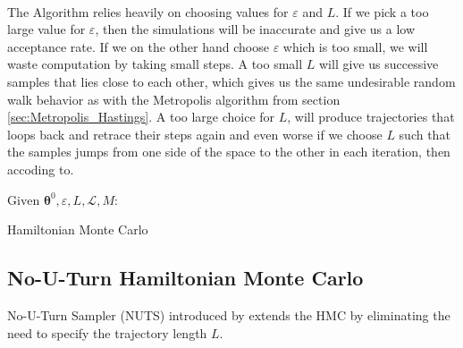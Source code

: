 \\
The Algorithm relies heavily on choosing values for $\varepsilon$ and $L$. If we pick a too large value for $\varepsilon$, then the simulations will be inaccurate and give us a low acceptance rate. If we on the other hand choose $\varepsilon$ which is too small, we will waste computation by taking small steps. A too small $L$ will give us successive samples that lies close to each other, which gives us the same undesirable random walk behavior as with the Metropolis algorithm from section \ref{sec:Metropolis_Hastings}. A too large choice for $L$, will produce trajectories that loops back and retrace their steps again and even worse if we choose $L$ such that the samples jumps from one side of the space to the other in each iteration, then accoding to.


\begin{algorithm}[h!]\label{alg:HMC}

\SetAlgoLined
$\text{Given } \boldsymbol{\theta}^{0}, \varepsilon, L, \mathcal{L}, M$:\\

\caption{Hamiltonian Monte Carlo}
\end{algorithm}







\subsection{No-U-Turn Hamiltonian Monte Carlo}
No-U-Turn Sampler (NUTS) introduced by \cite{hoffman2011nouturn}
extends the HMC by eliminating the need to specify the trajectory length $L$.

